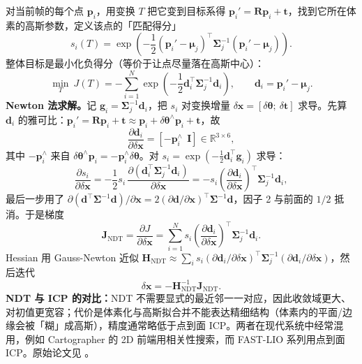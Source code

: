对当前帧的每个点 $\bm{p}_i$，用变换 $T$ 把它变到目标系得 $\bm{p}_i'=\bm{R}\bm{p}_i+\bm{t}$，找到它所在体素的高斯参数，定义该点的「匹配得分」
\begin{equation}
  s_i(T) = \exp\left(-\frac{1}{2}\left(\bm{p}_i'-\bm{\mu}_j\right)^{\top}\bm{\Sigma}_j^{-1}\left(\bm{p}_i'-\bm{\mu}_j\right)\right).
\end{equation}
整体目标是最小化负得分（等价于让点尽量落在高斯中心）：
\begin{equation}
  \min_{T}\ J(T) = -\sum_{i=1}^{N}\exp\left(-\frac{1}{2}\bm{d}_i^{\top}\bm{\Sigma}_j^{-1}\bm{d}_i\right),
  \qquad \bm{d}_i=\bm{p}_i'-\bm{\mu}_j.
  \label{eq:07-ndt-cost}
\end{equation}
\textbf{Newton 法求解。}记 $\bm{g}_i=\bm{\Sigma}_j^{-1}\bm{d}_i$，把 $s_i$ 对变换增量 $\delta\bm{x}=[\delta\bm{\theta};\ \delta\bm{t}]$ 求导。先算 $\bm{d}_i$ 的雅可比：$\bm{p}_i'=\bm{R}\bm{p}_i+\bm{t}\approx\bm{p}_i+\delta\bm{\theta}^{\wedge}\bm{p}_i+\bm{t}$，故
\begin{equation}
  \frac{\partial\bm{d}_i}{\partial\delta\bm{x}}
  = \left[-\bm{p}_i^{\wedge}\ \ \bm{I}\right]\in\mathbb{R}^{3\times6},
  \label{eq:07-ndt-jac}
\end{equation}
其中 $-\bm{p}_i^{\wedge}$ 来自 $\delta\bm{\theta}^{\wedge}\bm{p}_i=-\bm{p}_i^{\wedge}\delta\bm{\theta}$。对 $s_i=\exp(-\frac12\bm{d}_i^{\top}\bm{g}_i)$ 求导：
\begin{equation}
  \frac{\partial s_i}{\partial\delta\bm{x}}
  = -\frac{1}{2}s_i\,\frac{\partial\left(\bm{d}_i^{\top}\bm{\Sigma}_j^{-1}\bm{d}_i\right)}{\partial\delta\bm{x}}
  = -s_i\left(\frac{\partial\bm{d}_i}{\partial\delta\bm{x}}\right)^{\top}\bm{\Sigma}_j^{-1}\bm{d}_i,
\end{equation}
最后一步用了 $\partial(\bm{d}^{\top}\bm{\Sigma}^{-1}\bm{d})/\partial\bm{x}=2(\partial\bm{d}/\partial\bm{x})^{\top}\bm{\Sigma}^{-1}\bm{d}$，因子 2 与前面的 $1/2$ 抵消。于是梯度
\begin{equation}
  \bm{J}_{\text{NDT}} = \frac{\partial J}{\partial\delta\bm{x}}
  = \sum_{i=1}^{N}s_i\left(\frac{\partial\bm{d}_i}{\partial\delta\bm{x}}\right)^{\top}\bm{\Sigma}_j^{-1}\bm{d}_i.
\end{equation}
Hessian 用 Gauss-Newton 近似 $\bm{H}_{\text{NDT}}\approx\sum_i s_i(\partial\bm{d}_i/\partial\delta\bm{x})^{\top}\bm{\Sigma}_j^{-1}(\partial\bm{d}_i/\partial\delta\bm{x})$，然后迭代
\begin{equation}
  \delta\bm{x} = -\bm{H}_{\text{NDT}}^{-1}\bm{J}_{\text{NDT}}.
\end{equation}
\textbf{NDT 与 ICP 的对比：}NDT 不需要显式的最近邻一一对应，因此收敛域更大、对初值更宽容；代价是体素化与高斯拟合并不能表达精细结构（体素内的平面/边缘会被「糊」成高斯），精度通常略低于点到面 ICP。两者在现代系统中经常混用，例如 Cartographer 的 2D 前端用相关性搜索，而 FAST-LIO 系列用点到面 ICP。原始论文见 \cite{biber2003ndt}。

